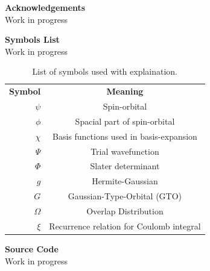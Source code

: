 \thispagestyle{empty}
\clearpage

\begin{center}
    \textbf{\Large{Acknowledgements}}\\ \vspace{0.6cm}
    Work in progress
\end{center}
\thispagestyle{empty}
\clearpage

\tableofcontents
\thispagestyle{empty}
\clearpage

\thispagestyle{empty}
\clearpage

\begin{center}
    \textbf{\Large{Symbols List}}\\ \vspace{0.6cm}
    Work in progress
    \begin{table}[H]
        \centering
        \begin{tabular}{rc}
            \textbf{Symbol} & \textbf{Meaning} \\
            $\psi$ & Spin-orbital \\
            $\phi$ & Spacial part of spin-orbital \\
            $\chi$ & Basis functions used in basis-expansion \\
            $\Psi$ & Trial wavefunction \\
            $\Phi$ & Slater determinant \\
            $g$ & Hermite-Gaussian \\
            $G$ & Gaussian-Type-Orbital (GTO) \\
            $\Omega$ & Overlap Distribution \\
            $\xi$ & Recurrence relation for Coulomb integral
        \end{tabular}
        \caption{List of symbols used with explaination.}
        \label{tab:symbols}
    \end{table}
\end{center}
\thispagestyle{empty}
\clearpage

\begin{center}
    \textbf{\Large{Source Code}}\\ \vspace{0.6cm}
    Work in progress
\end{center}
\thispagestyle{empty}
\clearpage

